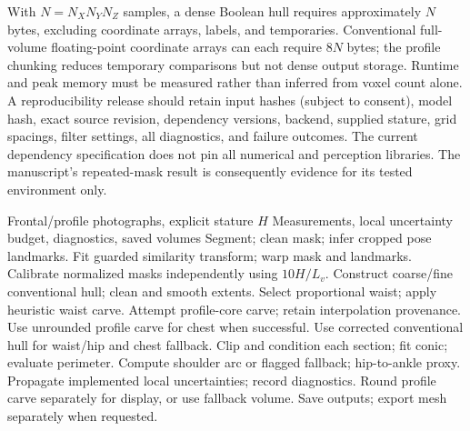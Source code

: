 With $N=N_XN_YN_Z$ samples, a dense Boolean hull requires approximately $N$ bytes, excluding coordinate arrays, labels, and temporaries. Conventional full-volume floating-point coordinate arrays can each require $8N$ bytes; the profile chunking reduces temporary comparisons but not dense output storage. Runtime and peak memory must be measured rather than inferred from voxel count alone. A reproducibility release should retain input hashes (subject to consent), model hash, exact source revision, dependency versions, backend, supplied stature, grid spacings, filter settings, all diagnostics, and failure outcomes. The current dependency specification does not pin all numerical and perception libraries. The manuscript's repeated-mask result is consequently evidence for its tested environment only.

\begin{algorithm}[!t]
\caption{Implemented Two-Branch Anthropometry Pipeline}
\label{alg:implemented_pipeline}
\begin{algorithmic}[1]
\REQUIRE Frontal/profile photographs, explicit stature $H$
\ENSURE Measurements, local uncertainty budget, diagnostics, saved volumes
\STATE Segment; clean mask; infer cropped pose landmarks.
\STATE Fit guarded similarity transform; warp mask and landmarks.
\ENDFOR
\STATE Calibrate normalized masks independently using $10H/L_v$.
\STATE Construct coarse/fine conventional hull; clean and smooth extents.
\STATE Select proportional waist; apply heuristic waist carve.
\STATE Attempt profile-core carve; retain interpolation provenance.
\STATE Use unrounded profile carve for chest when successful.
\STATE Use corrected conventional hull for waist/hip and chest fallback.
\STATE Clip and condition each section; fit conic; evaluate perimeter.
\STATE Compute shoulder arc or flagged fallback; hip-to-ankle proxy.
\STATE Propagate implemented local uncertainties; record diagnostics.
\STATE Round profile carve separately for display, or use fallback volume.
\STATE Save outputs; export mesh separately when requested.
\end{algorithmic}
\end{algorithm}

